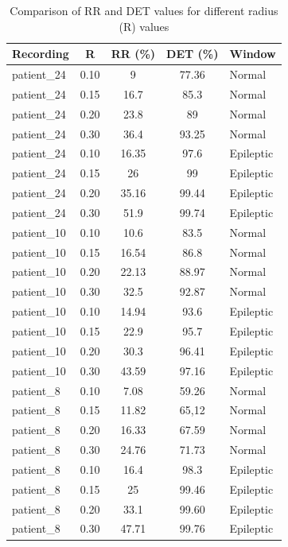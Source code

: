 \documentclass{article}
\begin{document}
		\begin{table}[h!]
		\centering
		\caption{Comparison of RR and DET values for different radius (R) values}
		\begin{tabular}{l S[table-format=1.2] S[table-format=2.2] S[table-format=2.2] l}
		\toprule
		\textbf{Recording} & \textbf{R} & \textbf{RR (\%)} & \textbf{DET (\%)} & \textbf{Window} \\
		\midrule
		patient\_24 & 0.10 & 9 & 77.36 & Normal \\
		patient\_24 & 0.15 & 16.7 & 85.3 & Normal \\
		patient\_24 & 0.20 & 23.8 & 89 & Normal \\
		patient\_24 & 0.30 & 36.4 & 93.25 & Normal \\
		patient\_24 & 0.10 & 16.35 & 97.6 & Epileptic \\
		patient\_24 & 0.15 & 26 & 99 & Epileptic \\
		patient\_24 & 0.20 & 35.16 & 99.44 & Epileptic \\
		patient\_24 & 0.30 & 51.9 & 99.74 & Epileptic \\

		\midrule
		patient\_10 & 0.10 & 10.6 & 83.5 & Normal \\
		patient\_10 & 0.15 & 16.54 & 86.8 & Normal \\
		patient\_10 & 0.20 & 22.13 & 88.97 & Normal \\
		patient\_10 & 0.30 & 32.5 & 92.87 & Normal \\
		patient\_10 & 0.10 & 14.94 & 93.6 & Epileptic \\
		patient\_10 & 0.15 & 22.9 & 95.7 & Epileptic \\
		patient\_10 & 0.20 & 30.3 & 96.41 & Epileptic \\
		patient\_10 & 0.30 & 43.59 & 97.16 & Epileptic \\

		\midrule
		patient\_8 & 0.10 & 7.08 & 59.26 & Normal \\
		patient\_8 & 0.15 & 11.82 & 65,12 & Normal \\
		patient\_8 & 0.20 & 16.33 & 67.59 & Normal \\
		patient\_8 & 0.30 & 24.76 & 71.73 & Normal \\
		patient\_8 & 0.10 & 16.4 & 98.3 & Epileptic \\
		patient\_8 & 0.15 & 25 & 99.46 & Epileptic \\
		patient\_8 & 0.20 & 33.1 & 99.60 & Epileptic \\
		patient\_8 & 0.30 & 47.71 & 99.76 & Epileptic \\





		\bottomrule
		\end{tabular}
		\end{table}


			\newpage




\end{document}
